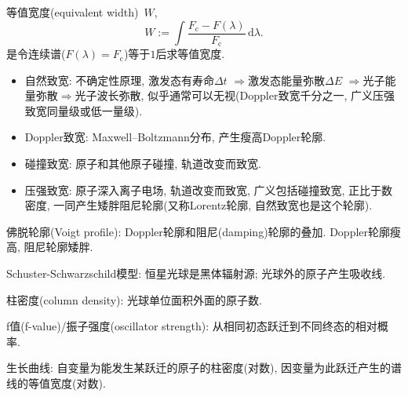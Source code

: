 等值宽度(equivalent width)~$W$,
\begin{equation*}
    W:=\int\frac{F_\text{c}-F(\lambda)}{F_\text{c}}\,\mathrm{d}\lambda.
\end{equation*}
是令连续谱($F(\lambda)=F_\text{c}$)等于$1$后求等值宽度.

\begin{itemize}
    \item 自然致宽: 不确定性原理, 激发态有寿命$\Delta t$ $\Rightarrow$激发态能量弥散$\Delta E$ $\Rightarrow$光子能量弥散$\Rightarrow$光子波长弥散, 似乎通常可以无视(Doppler致宽千分之一, 广义压强致宽同量级或低一量级).
    \item Doppler致宽: Maxwell--Boltzmann分布, 产生瘦高Doppler轮廓.
    \item 碰撞致宽: 原子和其他原子碰撞, 轨道改变而致宽.
    \item 压强致宽: 原子深入离子电场, 轨道改变而致宽, 广义包括碰撞致宽, 正比于数密度, 一同产生矮胖阻尼轮廓(又称Lorentz轮廓, 自然致宽也是这个轮廓).
\end{itemize}
佛脱轮廓(Voigt profile): Doppler轮廓和阻尼(damping)轮廓的叠加. Doppler轮廓瘦高, 阻尼轮廓矮胖.

Schuster-Schwarzschild模型: 恒星光球是黑体辐射源; 光球外的原子产生吸收线.

柱密度(column density): 光球单位面积外面的原子数.

f值(f-value)/振子强度(oscillator strength): 从相同初态跃迁到不同终态的相对概率.

生长曲线: 自变量为能发生某跃迁的原子的柱密度(对数), 因变量为此跃迁产生的谱线的等值宽度(对数).
